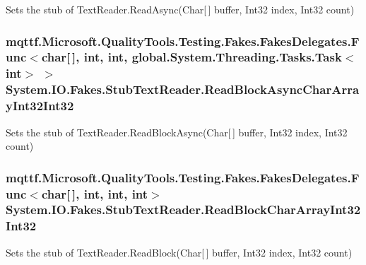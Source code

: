 Sets the stub of Text\-Reader.\-Read\-Async(\-Char\mbox{[}$\,$\mbox{]} buffer, Int32 index, Int32 count)

\hypertarget{class_system_1_1_i_o_1_1_fakes_1_1_stub_text_reader_a02f1dc3f1df304887e24a86fdc055aec}{
\subsubsection[{Read\-Block\-Async\-Char\-Array\-Int32\-Int32}]{\setlength{\rightskip}{0pt plus 5cm}mqttf.\-Microsoft.\-Quality\-Tools.\-Testing.\-Fakes.\-Fakes\-Delegates.\-Func$<$char\mbox{[}$\,$\mbox{]}, int, int, global.\-System.\-Threading.\-Tasks.\-Task$<$int$>$ $>$ System.\-I\-O.\-Fakes.\-Stub\-Text\-Reader.\-Read\-Block\-Async\-Char\-Array\-Int32\-Int32}}\label{class_system_1_1_i_o_1_1_fakes_1_1_stub_text_reader_a02f1dc3f1df304887e24a86fdc055aec}


Sets the stub of Text\-Reader.\-Read\-Block\-Async(\-Char\mbox{[}$\,$\mbox{]} buffer, Int32 index, Int32 count)

\hypertarget{class_system_1_1_i_o_1_1_fakes_1_1_stub_text_reader_a879e3f5e34c6ab08482e97d255c597d2}{
\subsubsection[{Read\-Block\-Char\-Array\-Int32\-Int32}]{\setlength{\rightskip}{0pt plus 5cm}mqttf.\-Microsoft.\-Quality\-Tools.\-Testing.\-Fakes.\-Fakes\-Delegates.\-Func$<$char\mbox{[}$\,$\mbox{]}, int, int, int$>$ System.\-I\-O.\-Fakes.\-Stub\-Text\-Reader.\-Read\-Block\-Char\-Array\-Int32\-Int32}}\label{class_system_1_1_i_o_1_1_fakes_1_1_stub_text_reader_a879e3f5e34c6ab08482e97d255c597d2}


Sets the stub of Text\-Reader.\-Read\-Block(\-Char\mbox{[}$\,$\mbox{]} buffer, Int32 index, Int32 count)


